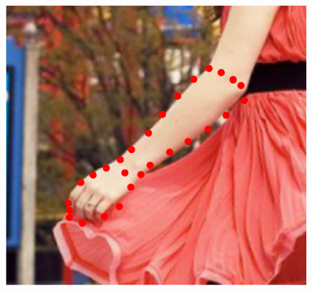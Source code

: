 \begin{figure}[!t]
    \includegraphics[height=\ofh]{resources/Fittings/21.eps}
    \hfill

\end{figure}
